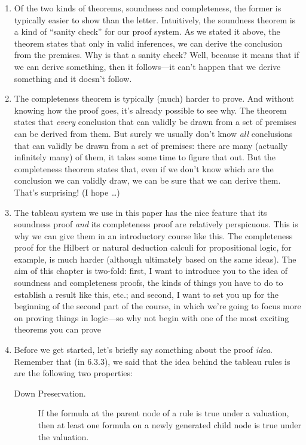\begin{enumerate}[\thesection.1]
	\item Of the two kinds of theorems, soundness and completeness, the former is typically easier to show than the letter. Intuitively, the soundness theorem is a kind of ``sanity check'' for our proof system. As we stated it above, the theorem states that only in valid inferences, we can derive the conclusion from the premises. Why is that a sanity check? Well, because it means that if we can derive something, then it follows---it can't happen that we derive something and it doesn't follow.
	
	\item The completeness theorem is typically (much) harder to prove. And without knowing how the proof goes, it's already possible to see why. The theorem states that \emph{every} conclusion that can validly be drawn from a set of premises can be derived from them. But surely we usually don't know \emph{all} conclusions that can validly be drawn from a set of premises: there are many (actually infinitely many) of them, it takes some time to figure that out. But the completeness theorem states that, even if we don't know which are the conclusion we can validly draw, we can be sure that we can derive them. That's surprising! (I hope \dots) 
	
	\item The tableau system we use in this paper has the nice feature that its soundness proof \emph{and} its completeness proof are relatively perspicuous. This is why we can give them in an introductory course like this. The completeness proof for the Hilbert or natural deduction calculi for propositional logic, for example, is much harder (although ultimately based on the same ideas). The aim of this chapter is two-fold: first, I want to introduce you to the idea of soundness and completeness proofs, the kinds of things you have to do to establish a result like this, etc.; and second, I want to set you up for the beginning of the second part of the course, in which we're going to focus more on proving things in logic---so why not begin with one of the most exciting theorems you can prove \smiley

	\item Before we get started, let's briefly say something about the proof \emph{idea}. Remember that (in 6.3.3), we said that the idea behind the tableau rules is are the following two properties:
		\begin{description}
			
				\item[Down Preservation.] If the formula at the parent node of a rule is true under a valuation, then at least one formula on a newly generated child node is true under the valuation.
				

\end{description}
\end{enumerate}
